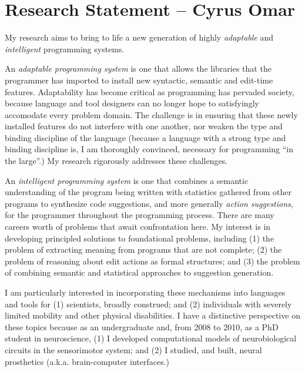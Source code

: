 \documentclass[10pt]{article}
\begin{document}
\section*{Research Statement -- Cyrus Omar}
My research aims to bring to life a new generation of highly \emph{adaptable} and \emph{intelligent} programming systems.

An \emph{adaptable programming system} is one that allows the libraries that the programmer has imported to install new syntactic, semantic and edit-time features. Adaptability has become critical as programming has pervaded society, because language and tool designers can no longer hope to satisfyingly accomodate every problem domain. The challenge is in ensuring that these newly installed features do not interfere with one another, nor weaken the type and binding discipline of the language (because a language with a strong type and binding discipline is, I am thoroughly convinced, necessary for programming ``in the large''.) My research rigorously addresses these challenges.  %

An \emph{intelligent programming system} is one that combines a semantic understanding of the program being written with statistics gathered from other programs to synthesize code suggestions, and more generally \emph{action suggestions}, for the programmer throughout the programming process. There are many careers worth of problems that await confrontation here. My interest is in developing principled solutions to foundational problems, including (1) the problem of extracting meaning from programs that are not complete; (2) the problem of reasoning about edit actions as formal structures; and (3) the problem of combining semantic and statistical approaches to suggestion generation.

I am particularly interested in incorporating these mechanisms into languages and tools for (1) scientists, broadly construed; and (2) individuals with severely limited mobility and other physical disabilities. I have a distinctive perspective on these topics because as an undergraduate and, from 2008 to 2010, as a PhD student in neuroscience, (1) I developed computational models of neurobiological circuits in the sensorimotor system; and (2) I studied, and built, neural prosthetics (a.k.a. brain-computer interfaces.)

\end{document}
